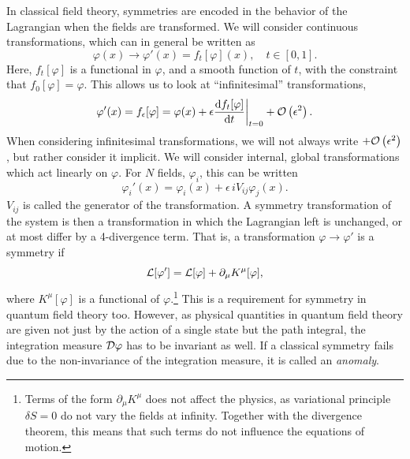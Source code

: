 In classical field theory, symmetries are encoded in the behavior of the Lagrangian when the fields are transformed.
We will consider continuous transformations, which can in general be written as
\begin{equation}
    \varphi(x) \longrightarrow \varphi'(x) = f_t[\varphi](x), \quad t \in [0, 1].
\end{equation}
%
Here, $f_t[\varphi]$ is a functional in $\varphi$, and a smooth function of $t$, with the constraint that $f_0[\varphi] = \varphi$.
This allows us to look at ``infinitesimal'' transformations,
\begin{equation}
    \label{infinitesimal transformation}
    \varphi'(x) = f_\epsilon[\varphi] 
    = \varphi(x) + \epsilon \diff{ f_t[\varphi] }{t}\bigg |_{t=0} + \Oh{\epsilon}.
\end{equation}
%
When considering infinitesimal transformations, we will not always write $ + \mathcal{O}\left(\epsilon^{2}\right)$, but rather consider it implicit.
We will consider internal, global transformations which act linearly on $\varphi$.
For $N$ fields, $\varphi_i$, this can be written
\begin{equation}
    \label{linear field transformation}
    \varphi_i'(x) = \varphi_i(x) + \epsilon \, i V_{ij} \varphi_j(x).
\end{equation}
%
$V_{ij}$ is called the generator of the transformation.
A symmetry transformation of the system is then a transformation in which the Lagrangian left is unchanged, or at most differ by a 4-divergence term.
That is, a transformation $\varphi \rightarrow \varphi'$ is a symmetry if 
\begin{equation}
    \mathcal{L}[\varphi'] = \mathcal{L}[\varphi] + \partial_\mu K^\mu[\varphi],
\end{equation}
%
where $K^\mu[\varphi]$ is a functional of $\varphi$.\footnote{Terms of the form $\partial_\mu K^\mu$ does not affect the physics, as variational principle $\delta S = 0$ do not vary the fields at infinity. Together with the divergence theorem, this means that such terms do not influence the equations of motion.}
This is a requirement for symmetry in quantum field theory too.
However, as physical quantities in quantum field theory are given not just by the action of a single state but the path integral, the integration measure $\mathcal{D} \varphi$ has to be invariant as well.
If a classical symmetry fails due to the non-invariance of the integration measure, it is called an \emph{anomaly}.

